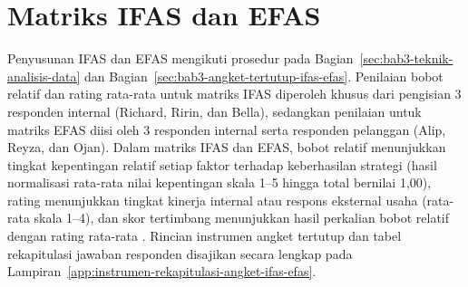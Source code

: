 \endgroup

\section{Matriks IFAS dan EFAS}
Penyusunan IFAS dan EFAS mengikuti prosedur pada Bagian~\ref{sec:bab3-teknik-analisis-data} dan Bagian~\ref{sec:bab3-angket-tertutup-ifas-efas}. Penilaian bobot relatif dan rating rata-rata untuk matriks IFAS diperoleh khusus dari pengisian 3 responden internal (Richard, Ririn, dan Bella), sedangkan penilaian untuk matriks EFAS diisi oleh 3 responden internal serta responden pelanggan (Alip, Reyza, dan Ojan). Dalam matriks IFAS dan EFAS, bobot relatif menunjukkan tingkat kepentingan relatif setiap faktor terhadap keberhasilan strategi (hasil normalisasi rata-rata nilai kepentingan skala 1--5 hingga total bernilai 1,00), rating menunjukkan tingkat kinerja internal atau respons eksternal usaha (rata-rata skala 1--4), dan skor tertimbang menunjukkan hasil perkalian bobot relatif dengan rating rata-rata \parencite{rangkuti2016analisisSWOT,david2023strategicmanagement}. Rincian instrumen angket tertutup dan tabel rekapitulasi jawaban responden disajikan secara lengkap pada Lampiran~\ref{app:instrumen-rekapitulasi-angket-ifas-efas}.


